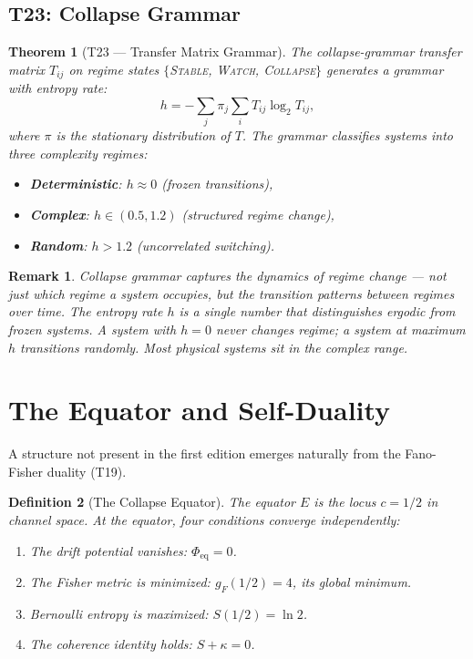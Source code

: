 \documentclass[
  aps,
  prd,
  preprint,
  superscriptaddress,
  nofootinbib,
  floatfix,
  longbibliography
]{revtex4-2}
\newtheorem{theorem}{Theorem}
\newtheorem{definition}[theorem]{Definition}
\newtheorem{remark}{Remark}
\newcommand{\beq}{\begin{equation}}
\newcommand{\eeq}{\end{equation}}
\newcommand{\regime}[1]{\textnormal{\textsc{#1}}}
\newcommand{\Ent}{S}
\newcommand{\Logint}{\kappa}
\newcommand{\gFisher}{g_{\!F}}
\begin{document}
\subsection{T23: Collapse Grammar}

\begin{theorem}[T23 — Transfer Matrix Grammar]\label{thm:T23}
The collapse-grammar transfer matrix
$T_{ij}$ on regime states
$\{$\regime{Stable}, \regime{Watch}, \regime{Collapse}$\}$
generates a grammar with entropy rate:
\beq
  h = -\sum_{j} \pi_j \sum_{i} T_{ij} \log_2 T_{ij},
\eeq
where $\pi$ is the stationary distribution of $T$.
The grammar classifies systems into three complexity regimes:
\begin{itemize}[nosep,leftmargin=*]
  \item \textbf{Deterministic}: $h \approx 0$
    \quad(frozen transitions),
  \item \textbf{Complex}: $h \in (0.5, 1.2)$
    \quad(structured regime change),
  \item \textbf{Random}: $h > 1.2$
    \quad(uncorrelated switching).
\end{itemize}
\end{theorem}

\begin{remark}
Collapse grammar captures the \emph{dynamics} of regime
change — not just which regime a system occupies, but
the transition patterns between regimes over time.
The entropy rate $h$ is a single number that distinguishes
ergodic from frozen systems.
A system with $h = 0$ never changes regime;
a system at maximum $h$ transitions randomly.
Most physical systems sit in the complex range.
\end{remark}

\section{The Equator and Self-Duality}\label{sec:equator}

A structure not present in the first edition emerges naturally
from the Fano-Fisher duality (T19).

\begin{definition}[The Collapse Equator]\label{def:equator}
The equator $E$ is the locus $c = 1/2$ in channel space.
At the equator, four conditions converge independently:
\begin{enumerate}[nosep,leftmargin=*]
  \item The drift potential vanishes: $\Phi_{\mathrm{eq}} = 0$.
  \item The Fisher metric is minimized:
    $\gFisher(1/2) = 4$, its global minimum.
  \item Bernoulli entropy is maximized: $\Ent(1/2) = \ln 2$.
  \item The coherence identity holds: $\Ent + \Logint = 0$.
\end{enumerate}
\end{definition}
\end{document}
